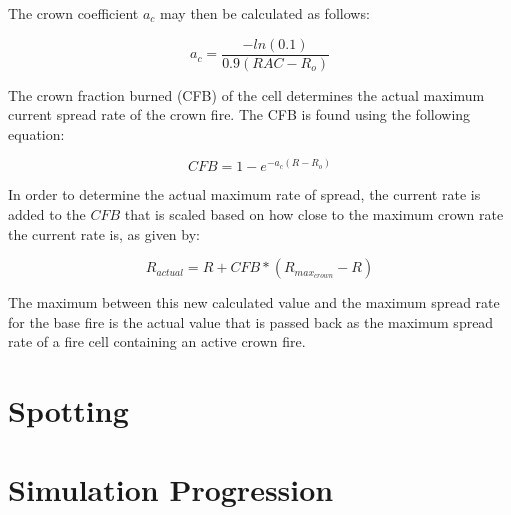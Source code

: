 The crown coefficient $a_c$ may then be calculated as follows:

\begin{equation}
a_c = \frac{-ln(0.1)}{0.9(RAC - R_o)}
\end{equation}

The crown fraction burned (CFB) of the cell determines the actual maximum current spread rate of the crown fire. The CFB is found using the following equation: 

\begin{equation}
CFB = 1 - e^{-a_c(R-R_o)}
\end{equation}

In order to determine the actual maximum rate of spread, the current rate is added to the $CFB$ that is scaled based on how close to the maximum crown rate the current rate is, as given by: 

\begin{equation}
R_{actual} = R + CFB * (R_{max_{crown}} - R)
\end{equation}

The maximum between this new calculated value and the maximum spread rate for the base fire is the actual value that is passed back as the maximum spread rate of a fire cell containing an active crown fire. 


\section{Spotting}

\section{Simulation Progression}